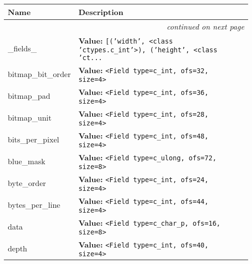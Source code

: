     \vspace{-1cm}
\hspace{\varindent}\begin{longtable}{|p{\varnamewidth}|p{\vardescrwidth}|l}
\cline{1-2}
\cline{1-2} \centering \textbf{Name} & \centering \textbf{Description}& \\
\cline{1-2}
\endhead\cline{1-2}\multicolumn{3}{r}{\small\textit{continued on next page}}\\\endfoot\cline{1-2}
\endlastfoot\raggedright \_\-f\-i\-e\-l\-d\-s\-\_\- & \raggedright \textbf{Value:} 
{\tt \texttt{[}\texttt{(}\texttt{'}\texttt{width}\texttt{'}\texttt{, }{\textless}class 'ctypes.c\_int'{\textgreater}\texttt{)}\texttt{, }\texttt{(}\texttt{'}\texttt{height}\texttt{'}\texttt{, }{\textless}class 'ct\texttt{...}}&\\
\cline{1-2}
\raggedright b\-i\-t\-m\-a\-p\-\_\-b\-i\-t\-\_\-o\-r\-d\-e\-r\- & \raggedright \textbf{Value:} 
{\tt {\textless}Field type=c\_int, ofs=32, size=4{\textgreater}}&\\
\cline{1-2}
\raggedright b\-i\-t\-m\-a\-p\-\_\-p\-a\-d\- & \raggedright \textbf{Value:} 
{\tt {\textless}Field type=c\_int, ofs=36, size=4{\textgreater}}&\\
\cline{1-2}
\raggedright b\-i\-t\-m\-a\-p\-\_\-u\-n\-i\-t\- & \raggedright \textbf{Value:} 
{\tt {\textless}Field type=c\_int, ofs=28, size=4{\textgreater}}&\\
\cline{1-2}
\raggedright b\-i\-t\-s\-\_\-p\-e\-r\-\_\-p\-i\-x\-e\-l\- & \raggedright \textbf{Value:} 
{\tt {\textless}Field type=c\_int, ofs=48, size=4{\textgreater}}&\\
\cline{1-2}
\raggedright b\-l\-u\-e\-\_\-m\-a\-s\-k\- & \raggedright \textbf{Value:} 
{\tt {\textless}Field type=c\_ulong, ofs=72, size=8{\textgreater}}&\\
\cline{1-2}
\raggedright b\-y\-t\-e\-\_\-o\-r\-d\-e\-r\- & \raggedright \textbf{Value:} 
{\tt {\textless}Field type=c\_int, ofs=24, size=4{\textgreater}}&\\
\cline{1-2}
\raggedright b\-y\-t\-e\-s\-\_\-p\-e\-r\-\_\-l\-i\-n\-e\- & \raggedright \textbf{Value:} 
{\tt {\textless}Field type=c\_int, ofs=44, size=4{\textgreater}}&\\
\cline{1-2}
\raggedright d\-a\-t\-a\- & \raggedright \textbf{Value:} 
{\tt {\textless}Field type=c\_char\_p, ofs=16, size=8{\textgreater}}&\\
\cline{1-2}
\raggedright d\-e\-p\-t\-h\- & \raggedright \textbf{Value:} 
{\tt {\textless}Field type=c\_int, ofs=40, size=4{\textgreater}}&\\

\end{longtable}
